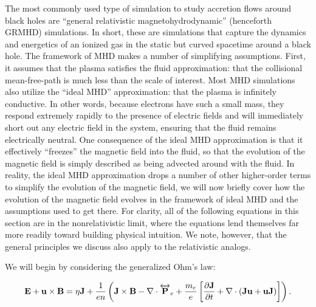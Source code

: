 The most commonly used type of simulation to study accretion flows around black holes are ``general relativistic magnetohydrodynamic'' (henceforth GRMHD) simulations.  In short, these are simulations that capture the dynamics and energetics of an ionized gas in the static but curved spacetime around a black hole.  The framework of MHD makes a number of simplifying assumptions.  First, it assumes that the plasma satisfies the fluid approximation: that the collisional mean-free-path is much less than the scale of interest.  Most MHD simulations also utilize the ``ideal MHD'' approximation: that the plasma is infinitely conductive.  In other words, because electrons have such a small mass, they respond extremely rapidly to the presence of electric fields and will immediately short out any electric field in the system, ensuring that the fluid remains electrically neutral.  One consequence of the ideal MHD approximation is that it effectively ``freezes'' the magnetic field into the fluid, so that the evolution of the magnetic field is simply described as being advected around with the fluid.  In reality, the ideal MHD approximation drops a number of other higher-order terms to simplify the evolution of the magnetic field, we will now briefly cover how the evolution of the magnetic field evolves in the framework of ideal MHD and the assumptions used to get there.  For clarity, all of the following equations in this section are in the nonrelativistic limit, where the equations lend themselves far more readily toward building physical intuition.  We note, however, that the general principles we discuss also apply to the relativistic analogs.

We will begin by considering the generalized Ohm's law:

\begin{equation}
	\bold{E}+\bold{u}\times \bold{B} = 
	\eta \bold{J} + \frac{1}{e n}\left(\bold{J} \times \bold{B} - \nabla \cdot \overleftrightarrow{\bold{P}}_{e} + \frac{m_e}{e}\left[\frac{\partial \bold{J}}{\partial t}+\nabla \cdot (\bold{Ju} + \bold{uJ})\right]\right).
	\label{ohm}
\end{equation}

